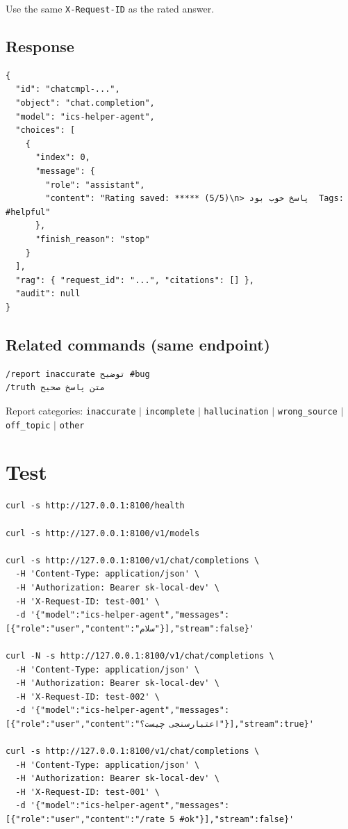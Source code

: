 \documentclass[11pt,a4paper]{article}
\begin{document}
\noindent Use the same \texttt{X-Request-ID} as the rated answer.

\subsection{Response}

\begin{lstlisting}
{
  "id": "chatcmpl-...",
  "object": "chat.completion",
  "model": "ics-helper-agent",
  "choices": [
    {
      "index": 0,
      "message": {
        "role": "assistant",
        "content": "Rating saved: ***** (5/5)\n> پاسخ خوب بود  Tags: #helpful"
      },
      "finish_reason": "stop"
    }
  ],
  "rag": { "request_id": "...", "citations": [] },
  "audit": null
}
\end{lstlisting}

\subsection{Related commands (same endpoint)}

\begin{lstlisting}
/report inaccurate توضیح #bug
/truth متن پاسخ صحیح
\end{lstlisting}

\noindent Report categories: \texttt{inaccurate} $|$ \texttt{incomplete} $|$ \texttt{hallucination} $|$ \texttt{wrong_source} $|$ \texttt{off_topic} $|$ \texttt{other}

\section{Test}

\begin{lstlisting}
curl -s http://127.0.0.1:8100/health

curl -s http://127.0.0.1:8100/v1/models

curl -s http://127.0.0.1:8100/v1/chat/completions \
  -H 'Content-Type: application/json' \
  -H 'Authorization: Bearer sk-local-dev' \
  -H 'X-Request-ID: test-001' \
  -d '{"model":"ics-helper-agent","messages":[{"role":"user","content":"سلام"}],"stream":false}'

curl -N -s http://127.0.0.1:8100/v1/chat/completions \
  -H 'Content-Type: application/json' \
  -H 'Authorization: Bearer sk-local-dev' \
  -H 'X-Request-ID: test-002' \
  -d '{"model":"ics-helper-agent","messages":[{"role":"user","content":"اعتبارسنجی چیست؟"}],"stream":true}'

curl -s http://127.0.0.1:8100/v1/chat/completions \
  -H 'Content-Type: application/json' \
  -H 'Authorization: Bearer sk-local-dev' \
  -H 'X-Request-ID: test-001' \
  -d '{"model":"ics-helper-agent","messages":[{"role":"user","content":"/rate 5 #ok"}],"stream":false}'
\end{lstlisting}
\end{document}
